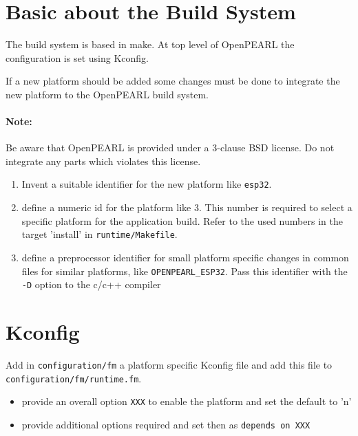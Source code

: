 \section{Basic about the Build System}
The build system is based in make.
At top level of OpenPEARL the configuration is set using Kconfig.

If a new platform should be added some changes must be done to integrate
the new platform to the OpenPEARL build system.

\paragraph{Note:}
Be aware that OpenPEARL is provided under a 3-clause BSD license.
Do not integrate any parts which violates this license.

\begin{enumerate}
\item Invent a suitable identifier for the new platform
like \verb|esp32|.
\item define a numeric id for the platform like 3. This number is required
  to select a specific platform for the application build.
  Refer to the used numbers in the target 'install' 
  in \verb|runtime/Makefile|.
\item define a preprocessor identifier for small platform specific
   changes in common files for similar platforms, like \verb|OPENPEARL_ESP32|.
   Pass this identifier with the \verb|-D| option to the c/c++ compiler
\end{enumerate}

\section{Kconfig}
Add in \verb|configuration/fm| a platform specific Kconfig file and add this 
file to \verb|configuration/fm/runtime.fm|.

\begin{itemize}
\item provide an overall option \verb|XXX| 
   to enable the platform and set the default 
      to 'n'
\item provide additional options required and set then as 
   \verb|depends on XXX|
\end{itemize}

